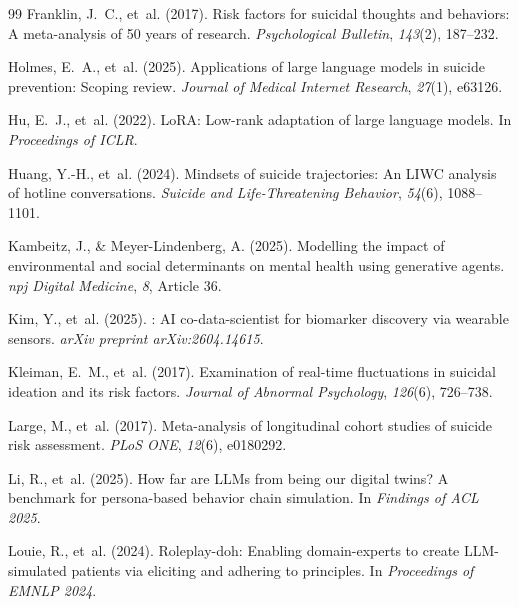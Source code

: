 \documentclass[review,12pt,authoryear]{elsarticle}
\begin{document}
\begin{thebibliography}{99}
Franklin, J.~C., et~al. (2017).
\newblock Risk factors for suicidal thoughts and behaviors: {A} meta-analysis of 50 years of research.
\newblock \textit{Psychological Bulletin}, \textit{143}(2), 187--232.

Holmes, E.~A., et~al. (2025).
\newblock Applications of large language models in suicide prevention: {S}coping review.
\newblock \textit{Journal of Medical Internet Research}, \textit{27}(1), e63126.

Hu, E.~J., et~al. (2022).
\newblock Lo{RA}: {L}ow-rank adaptation of large language models.
\newblock In \textit{Proceedings of ICLR}.

Huang, Y.-H., et~al. (2024).
\newblock Mindsets of suicide trajectories: {A}n {LIWC} analysis of hotline conversations.
\newblock \textit{Suicide and Life-Threatening Behavior}, \textit{54}(6), 1088--1101.

Kambeitz, J., \& Meyer-Lindenberg, A. (2025).
\newblock Modelling the impact of environmental and social determinants on mental health using generative agents.
\newblock \textit{npj Digital Medicine}, \textit{8}, Article 36.

Kim, Y., et~al. (2025).
: {AI} co-data-scientist for biomarker discovery via wearable sensors.
\newblock \textit{arXiv preprint arXiv:2604.14615}.

Kleiman, E.~M., et~al. (2017).
\newblock Examination of real-time fluctuations in suicidal ideation and its risk factors.
\newblock \textit{Journal of Abnormal Psychology}, \textit{126}(6), 726--738.

Large, M., et~al. (2017).
\newblock Meta-analysis of longitudinal cohort studies of suicide risk assessment.
\newblock \textit{PLoS ONE}, \textit{12}(6), e0180292.


Li, R., et~al. (2025).
\newblock How far are {LLMs} from being our digital twins? {A} benchmark for persona-based behavior chain simulation.
\newblock In \textit{Findings of ACL 2025}.

Louie, R., et~al. (2024).
\newblock Roleplay-doh: {E}nabling domain-experts to create {LLM}-simulated patients via eliciting and adhering to principles.
\newblock In \textit{Proceedings of EMNLP 2024}.


\end{thebibliography}
\end{document}
